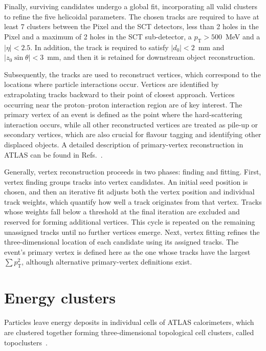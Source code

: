 Finally, surviving candidates undergo a global fit, incorporating all valid clusters to refine the five helicoidal parameters. The chosen tracks are required to have at least 7 clusters between the Pixel and the SCT detectors, less than 2 holes in the Pixel and a maximum of 2 holes in the SCT sub-detector, a $p_{\text{T}} > 500$~MeV and a $|\eta|<2.5$. In addition, the track is required to satisfy $|d_0|<2$~mm and $|z_0\sin\theta|<3$~mm, and then it is retained for downstream object reconstruction.

Subsequently, the tracks are used to reconstruct vertices, which correspond to the locations where particle interactions occur. Vertices are identified by extrapolating tracks backward to their point of closest approach. Vertices occurring near the proton–proton interaction region are of key interest. The primary vertex of an event is defined as the point where the hard-scattering interaction occurs, while all other reconstructed vertices are treated as pile-up or secondary vertices, which are also crucial for 
flavour tagging and identifying other displaced objects. A detailed description of primary-vertex reconstruction in ATLAS can be found in Refs.~\cite{vertex_run1,vertex_run2,vertex_run3,vertex_run3_2}.

Generally, vertex reconstruction proceeds in two phases: finding and fitting. First, vertex finding groups tracks into vertex candidates. An initial seed position is chosen, and then an iterative fit adjusts both the vertex position and individual track weights, which quantify how well a track originates from that vertex. Tracks whose weights fall below a threshold at the final iteration are excluded and reserved for forming additional vertices. This cycle is repeated on the remaining unassigned tracks until no further vertices emerge. 
Next, vertex fitting refines the three-dimensional location of each candidate using its assigned tracks. The event’s primary vertex is defined here as the one whose tracks have the largest $\sum p^2_{\text{T}}$, although alternative primary-vertex definitions exist.

\section{Energy clusters}
\label{sec:clusters}

Particles leave energy deposits in individual cells of ATLAS calorimeters, which are clustered together forming three-dimensional topological cell clusters, called topoclusters~\cite{topo}.

